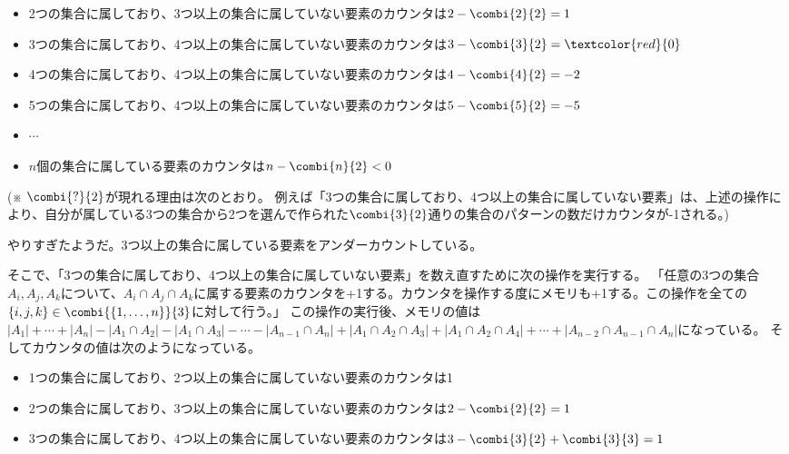 {\begin{itemize}
                        \item 2つの集合に属しており、3つ以上の集合に属していない要素のカウンタは$2-\combi{2}{2}=1$
                        \item 3つの集合に属しており、4つ以上の集合に属していない要素のカウンタは$3-\combi{3}{2}=\textcolor{red}{0}$
                        \item 4つの集合に属しており、4つ以上の集合に属していない要素のカウンタは$4-\combi{4}{2}=-2$
                        \item 5つの集合に属しており、4つ以上の集合に属していない要素のカウンタは$5-\combi{5}{2}=-5$
                        \item $\cdots$
                        \item $n$個の集合に属している要素のカウンタは$n - \combi{n}{2} < 0$
                    \end{itemize}
                    (※ $\combi{?}{2}$が現れる理由は次のとおり。
                    例えば「3つの集合に属しており、4つ以上の集合に属していない要素」は、上述の操作により、自分が属している3つの集合から2つを選んで作られた$\combi{3}{2}$通りの集合のパターンの数だけカウンタが-1される。)
                    \par
                    やりすぎたようだ。3つ以上の集合に属している要素をアンダーカウントしている。
                    \par
                    そこで、「3つの集合に属しており、4つ以上の集合に属していない要素」を数え直すために次の操作を実行する。
                    「任意の3つの集合$A_i,A_j,A_k$について、$A_i\cap A_j\cap A_k$に属する要素のカウンタを+1する。カウンタを操作する度にメモリも+1する。この操作を全ての$\{i,j,k\}\in\combi{\numset}{3}$に対して行う。」
                    この操作の実行後、メモリの値は$|A_1|+\dotsb +|A_n| - |A_1\cap A_2| - |A_1\cap A_3| - \dotsb - |A_{n-1}\cap A_n| + |A_1\cap A_2\cap A_3| + |A_1\cap A_2\cap A_4| + \dotsb + |A_{n-2}\cap A_{n-1}\cap A_n|$になっている。
                    そしてカウンタの値は次のようになっている。
                    \begin{itemize}
                        \item 1つの集合に属しており、2つ以上の集合に属していない要素のカウンタは1
                        \item 2つの集合に属しており、3つ以上の集合に属していない要素のカウンタは$2-\combi{2}{2}=1$
                        \item 3つの集合に属しており、4つ以上の集合に属していない要素のカウンタは$3-\combi{3}{2}+\combi{3}{3}=1$

\end{itemize}}
